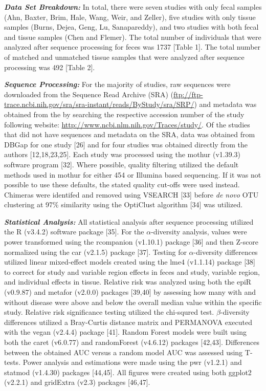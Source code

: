 \documentclass[12pt,]{article}
\begin{document}
\textbf{\emph{Data Set Breakdown:}} In total, there were seven studies
with only fecal samples (Ahn, Baxter, Brim, Hale, Wang, Weir, and
Zeller), five studies with only tissue samples (Burns, Dejea, Geng, Lu,
Sanapareddy), and two studies with both fecal and tissue samples (Chen
and Flemer). The total number of individuals that were analyzed after
sequence processing for feces was 1737 {[}Table 1{]}. The total number
of matched and unmatched tissue samples that were analyzed after
sequence processing was 492 {[}Table 2{]}.

\textbf{\emph{Sequence Processing:}} For the majority of studies, raw
sequences were downloaded from the Sequence Read Archive (SRA)
(\url{ftp://ftp-trace.ncbi.nih.gov/sra/sra-instant/reads/ByStudy/sra/SRP/})
and metadata was obtained from the by searching the respective accession
number of the study following website:
\url{http://www.ncbi.nlm.nih.gov/Traces/study/}. Of the studies that did
not have sequences and metadata on the SRA, data was obtained from DBGap
for one study {[}26{]} and for four studies was obtained directly from
the authors {[}12,18,23,25{]}. Each study was processed using the mothur
(v1.39.3) software program {[}32{]}. Where possible, quality filtering
utilized the default methods used in mothur for either 454 or Illumina
based sequencing. If it was not possible to use these defaults, the
stated quality cut-offs were used instead. Chimeras were identifed and
removed using VSEARCH {[}33{]} before \emph{de novo} OTU clustering at
97\% similarity using the OptiClust algorithm {[}34{]} was utilized.

\textbf{\emph{Statistical Analysis:}} All statistical analysis after
sequence processing utilized the R (v3.4.2) software package {[}35{]}.
For the \(\alpha\)-diversity analysis, values were power transformed
using the rcompanion (v1.10.1) package {[}36{]} and then Z-score
normalized using the car (v2.1.5) package {[}37{]}. Testing for
\(\alpha\)-diversity differences utilized linear mixed-effect models
created using the lme4 (v1.1.14) package {[}38{]} to correct for study
and variable region effects in feces and study, variable region, and
individual effects in tissue. Relative risk was analyzed using both the
epiR (v0.9.87) and metafor (v2.0.0) packages {[}39,40{]} by assessing
how many with and without disease were above and below the overall
median value within the specific study. Relative risk significance
testing utilized the chi-squred test. \(\beta\)-diversity differences
utilized a Bray-Curtis distance matrix and PERMANOVA executed with the
vegan (v2.4.4) package {[}41{]}. Random Forest models were built using
both the caret (v6.0.77) and randomForest (v4.6.12) packages
{[}42,43{]}. Differences between the obtained AUC versus a random model
AUC was assessed using T-tests. Power analysis and estimations were made
using the pwr (v1.2.1) and statmod (v1.4.30) packages {[}44,45{]}. All
figures were created using both ggplot2 (v2.2.1) and gridExtra (v2.3)
packages {[}46,47{]}.
\end{document}
